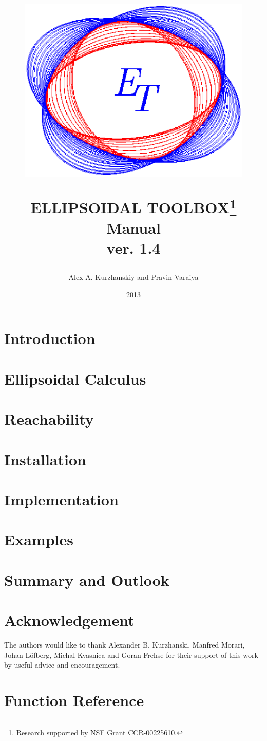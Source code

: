 \documentclass{report}
\title{
\begin{figure}[htbp]
\centerline{
\includegraphics[height=5 cm]{logo.eps}}
\end{figure}
ELLIPSOIDAL TOOLBOX\thanks{Research supported by NSF Grant CCR-00225610.}\\
Manual\\
\normalsize{ver. 1.4}
\author{Alex A. Kurzhanskiy and Pravin Varaiya}
\date{2013}
}
\begin{document}
\maketitle
\tableofcontents

\chapter{Introduction}\label{ch_intro}


\chapter{Ellipsoidal Calculus}\label{ch_ellcalc}


\chapter{Reachability}\label{ch_reachability}


\chapter{Installation}\label{ch_install}


\chapter{Implementation}\label{ch_implementation}


\chapter{Examples}\label{ch_examples}


\chapter{Summary and Outlook}\label{ch_summary}


\chapter*{Acknowledgement}
The authors would like to thank Alexander B. Kurzhanski,
Manfred Morari, Johan L{\"o}fberg, Michal Kvasnica and Goran Frehse
for their support of this work by useful advice and encouragement.



\appendix
\chapter{Function Reference}\label{appendix_a}

\end{document}
